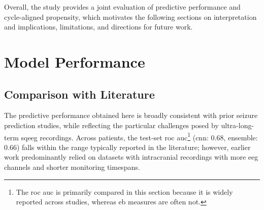 Overall, the study provides a joint evaluation of predictive performance and cycle-aligned propensity, which motivates the following sections on interpretation and implications, limitations, and directions for future work.


\section{Model Performance}\label{subsec:discussion-model-performance}

\subsection{Comparison with Literature}





The predictive performance obtained here is broadly consistent with prior seizure prediction studies, while reflecting the particular challenges posed by ultra-long-term \gls{sqeeg} recordings.
Across patients, the test-set \gls{roc auc}\footnote{The \gls{roc auc} is primarily compared in this section because it is widely reported across studies, whereas \gls{eb} measures are often not.} (\gls{cnn}: \num{0.68}, ensemble: \num{0.66}) falls within the range typically reported in the literature; however, earlier work predominantly relied on datasets with intracranial recordings with more \gls{eeg} channels and shorter monitoring timespans.


